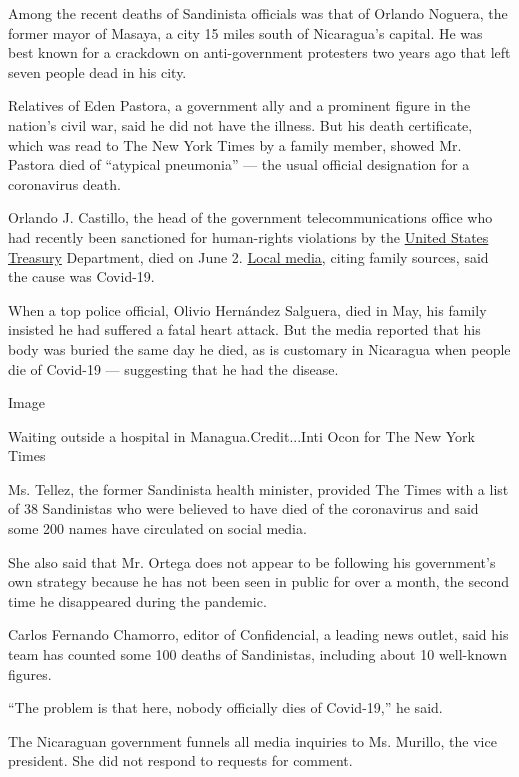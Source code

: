 Among the recent deaths of Sandinista officials was that of Orlando
Noguera, the former mayor of Masaya, a city 15 miles south of
Nicaragua's capital. He was best known for a crackdown on
anti-government protesters two years ago that left seven people dead in
his city.

Relatives of Eden Pastora, a government ally and a prominent figure in
the nation's civil war, said he did not have the illness. But his death
certificate, which was read to The New York Times by a family member,
showed Mr. Pastora died of ``atypical pneumonia'' --- the usual official
designation for a coronavirus death.

Orlando J. Castillo, the head of the government telecommunications
office who had recently been sanctioned for human-rights violations by
the \href{https://home.treasury.gov/news/press-releases/sm715}{United
States Treasury} Department, died on June 2.
\href{https://confidencial.com.ni/rosario-murillo-admite-muertes-de-orlando-castillo-y-orlando-noguera/}{Local
media}, citing family sources, said the cause was Covid-19.

When a top police official, Olivio Hernández Salguera, died in May, his
family insisted he had suffered a fatal heart attack. But the media
reported that his body was buried the same day he died, as is customary
in Nicaragua when people die of Covid-19 --- suggesting that he had the
disease.

Image

Waiting outside a hospital in Managua.Credit...Inti Ocon for The New
York Times

Ms. Tellez, the former Sandinista health minister, provided The Times
with a list of 38 Sandinistas who were believed to have died of the
coronavirus and said some 200 names have circulated on social media.

She also said that Mr. Ortega does not appear to be following his
government's own strategy because he has not been seen in public for
over a month, the second time he disappeared during the pandemic.

Carlos Fernando Chamorro, editor of Confidencial, a leading news outlet,
said his team has counted some 100 deaths of Sandinistas, including
about 10 well-known figures.

``The problem is that here, nobody officially dies of Covid-19,'' he
said.

The Nicaraguan government funnels all media inquiries to Ms. Murillo,
the vice president. She did not respond to requests for comment.

